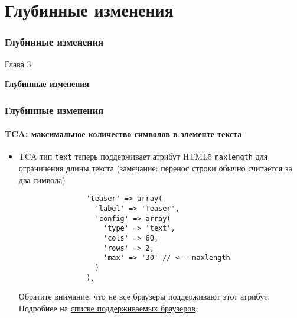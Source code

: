 %

\section{Глубинные изменения}
\begin{frame}[fragile]
	\frametitle{Глубинные изменения}

	\begin{center}\huge{Глава 3:}\end{center}
	\begin{center}\huge{\color{typo3darkgrey}\textbf{Глубинные изменения}}\end{center}

\end{frame}


\begin{frame}[fragile]
	\frametitle{Глубинные изменения}
	\framesubtitle{TCA: максимальное количество символов в элементе текста}

	\begin{itemize}
		\item TCA тип \texttt{text} теперь поддерживает атрибут HTML5 \texttt{maxlength}
			для ограничения длины текста (замечание: перенос строки обычно считается за два
			символа)

			\begin{lstlisting}
				'teaser' => array(
				  'label' => 'Teaser',
				  'config' => array(
				    'type' => 'text',
				    'cols' => 60,
				    'rows' => 2,
				    'max' => '30' // <-- maxlength
				  )
				),
			\end{lstlisting}

			Обратите внимание, что не все браузеры поддерживают этот атрибут.\newline
			Подробнее на \href{http://www.w3schools.com/tags/att_textarea_maxlength.asp}{списке поддерживаемых браузеров}.

	\end{itemize}

\end{frame}

